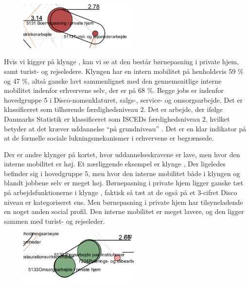 %
\begin{figure}
  \vspace{-20pt}
  \begin{center}
    \includegraphics[width=6cm]{fig/segzoom/seg_2_78.pdf}
   \caption{}
   \label{fig_delanalyse1_zoom_2_78}
  \end{center}
  \vspace{-20pt}
\end{figure}
%
Hvis vi kigger på klynge , kan vi se at den består børnepasning i private hjem, samt turist- og rejseledere. Klyngen har en intern mobilitet på henholdsvis  59 \% og 47 \%, altså ganske lavt sammenlignet med den gennemsnitlige interne mobilitet indenfor erhvervene selv, der er på 68 \%.  Begge jobs er indenfor hovedgruppe 5 i Disco-nomenklaturet, salgs-, service- og omsorgsarbejde. Det er klassificeret som tilhørende færdighedsniveau 2. Det er arbejde, der ifølge Danmarks Statistik er klassificeret som ISCEDs færdighedsniveau 2, hvilket betyder at det kræver uddannelse “på grundniveau” \parencite[tabel 1]{DSTDISCO88}. Det er en klar indikator på at de formelle sociale lukningsmekanismer i erhvervene er begrænsede. 

Der er andre klynger på kortet, hvor uddannelseskravene er lave, men hvor den interne mobilitet er høj. Et nærliggende eksempel er klynge , Der ligeledes befinder sig i hovedgruppe 5, men hvor den interne mobilitet både i klyngen og blandt jobbene selv er meget høj. Børnepasning i private hjem ligger ganske tæt på arbejdsfunktionerne i klynge , faktisk så tæt at de også på et 3-cifret Disco niveau er kategoriseret ens. Men børnepasning i private hjem har tilsyneladende en noget anden social profil. Den interne mobilitet er meget lavere, og den ligger sammen med turist- og rejseleder. 
%
\begin{figure}
  \vspace{-20pt}
  \begin{center}
    \includegraphics[width=6cm]{fig/segzoom/seg_2_66.pdf}
   \caption{}
   \label{fig_delanalyse1_zoom_2_66}
  \end{center}
  \vspace{-20pt}
\end{figure}

